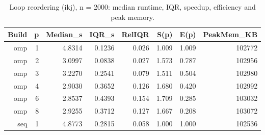 \begin{table}[ht]
\centering
\small
\begin{tabular}{rrrrrrrr}
\hline
Build & p & Median\_s & IQR\_s & RelIQR & S(p) & E(p) & PeakMem\_KB \\
\hline
omp & 1 & 4.8314 & 0.1236 & 0.026 & 1.009 & 1.009 & 102772 \\
omp & 2 & 3.0997 & 0.0838 & 0.027 & 1.573 & 0.787 & 102956 \\
omp & 3 & 3.2270 & 0.2541 & 0.079 & 1.511 & 0.504 & 102980 \\
omp & 4 & 2.9030 & 0.3652 & 0.126 & 1.680 & 0.420 & 102992 \\
omp & 6 & 2.8537 & 0.4393 & 0.154 & 1.709 & 0.285 & 103032 \\
omp & 8 & 2.9255 & 0.3712 & 0.127 & 1.667 & 0.208 & 103072 \\
seq & 1 & 4.8773 & 0.2815 & 0.058 & 1.000 & 1.000 & 102536 \\
\hline
\end{tabular}
\caption{Loop reordering (ikj), n = 2000: median runtime, IQR, speedup, efficiency and peak memory.}
\label{tab:results_ikj_n2000}
\end{table}
